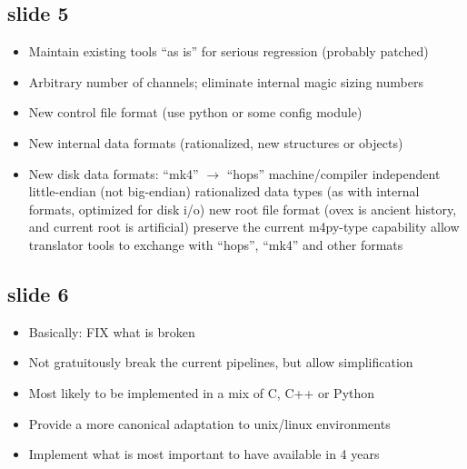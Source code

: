 \subsection{slide 5}
\begin{itemize}
\item Maintain existing tools “as is” for serious regression (probably patched)
\item Arbitrary number of channels; eliminate internal magic sizing numbers
\item New control file format (\eg use python or some config module)
\item New internal data formats (rationalized, new structures or objects)
\item New disk data formats: “mk4” $\rightarrow$ “hops”
\sbitem machine/compiler independent little-endian (not big-endian)
\sbitem rationalized data types (as with internal formats, optimized for disk i/o)
\sbitem new root file format (ovex is ancient history, and current root is artificial)
\sbitem preserve the current m4py-type capability
\sbitem allow translator tools to exchange with “hops”, “mk4” and other formats
\end{itemize}

\subsection{slide 6}
\begin{itemize}
\item Basically: FIX what is broken
\item Not gratuitously break the current pipelines, but allow simplification
\item Most likely to be implemented in a mix of C, C++ or Python
\item Provide a more canonical adaptation to unix/linux environments
\item Implement what is most important to have available in 4 years
\end{itemize}
%
%
